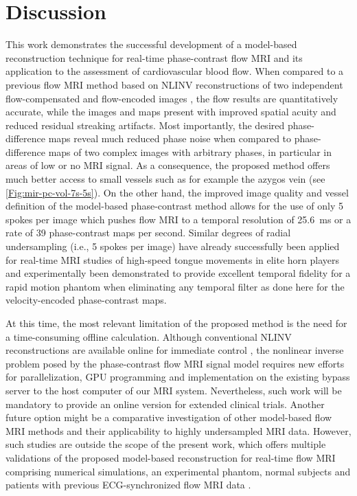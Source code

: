 \clearpage

\section{Discussion}
This work demonstrates the successful development of a model-based reconstruction technique for real-time phase-contrast flow MRI and its application to the assessment of cardiovascular blood flow. When compared to a previous flow MRI method based on NLINV reconstructions of two independent flow-compensated and flow-encoded images \cite{2015_PC_Asym}, the flow results are quantitatively accurate, while the images and maps present with improved spatial acuity and reduced residual streaking artifacts. Most importantly, the desired phase-difference maps reveal much reduced phase noise when compared to phase-difference maps of two complex images with arbitrary phases, in particular in areas of low or no MRI signal. As a consequence, the proposed method offers much better access to small vessels such as for example the azygos vein (see \cref{Fig:mir-pc-vol-7s-5s}). On the other hand, the improved image quality and vessel definition of the model-based phase-contrast method allows for the use of only \num{5} spokes per image which pushes flow MRI to a temporal resolution of \SI{25.6}{\ms} or a rate of \num{39} phase-contrast maps per second. Similar degrees of radial undersampling (i.e., \num{5} spokes per image) have already successfully been applied for real-time MRI studies of high-speed tongue movements in elite horn players \cite{2015_horn_QIM} and experimentally been demonstrated to provide excellent temporal fidelity for a rapid motion phantom \cite{2014_Temp_Fidelity} when eliminating any temporal filter as done here for the velocity-encoded phase-contrast maps.

At this time, the most relevant limitation of the proposed method is the need for a time-consuming offline calculation. Although conventional NLINV reconstructions are available online for immediate control \cite{2015_PC_Asym}, the nonlinear inverse problem posed by the phase-contrast flow MRI signal model requires new efforts for parallelization, GPU programming and implementation on the existing bypass server to the host computer of our MRI system. Nevertheless, such work will be mandatory to provide an online version for extended clinical trials. Another future option might be a comparative investigation of other model-based flow MRI methods and their applicability to highly undersampled MRI data. However, such studies are outside the scope of the present work, which offers multiple validations of the proposed model-based reconstruction for real-time flow MRI comprising numerical simulations, an experimental phantom, normal subjects and patients with previous ECG-synchronized flow MRI data \cite{2015_PC_Asym}.

